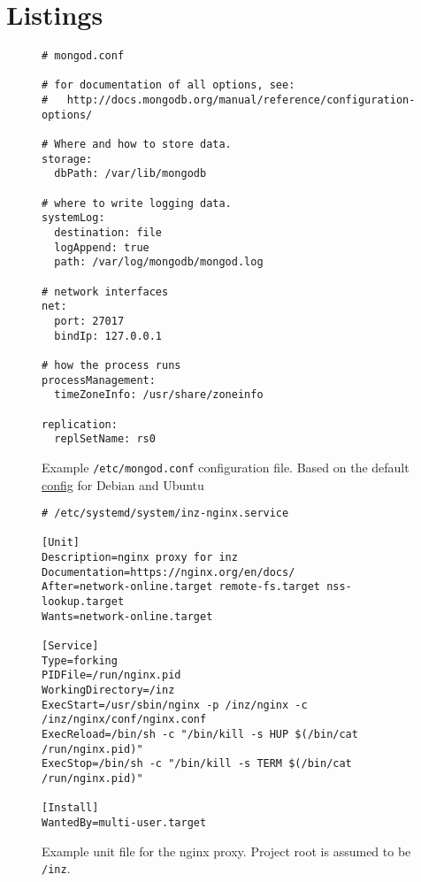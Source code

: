 \chapter{Listings}

\begin{figure}
	\centering
	\begin{verbatim}
# mongod.conf

# for documentation of all options, see:
#   http://docs.mongodb.org/manual/reference/configuration-options/

# Where and how to store data.
storage:
  dbPath: /var/lib/mongodb

# where to write logging data.
systemLog:
  destination: file
  logAppend: true
  path: /var/log/mongodb/mongod.log

# network interfaces
net:
  port: 27017
  bindIp: 127.0.0.1

# how the process runs
processManagement:
  timeZoneInfo: /usr/share/zoneinfo

replication:
  replSetName: rs0
	\end{verbatim}
	\caption{Example \texttt{/etc/mongod.conf} configuration file. Based on the default \href{https://github.com/mongodb/mongo/blob/e4fff3e1fe7b31b25cedde7b05205325b47b4a7d/debian/mongod.conf}{config} for Debian and Ubuntu}
	\label{fig:example-mongod}
\end{figure}

\begin{figure}
	\centering
	\begin{verbatim}
# /etc/systemd/system/inz-nginx.service

[Unit]
Description=nginx proxy for inz
Documentation=https://nginx.org/en/docs/
After=network-online.target remote-fs.target nss-lookup.target
Wants=network-online.target

[Service]
Type=forking
PIDFile=/run/nginx.pid
WorkingDirectory=/inz
ExecStart=/usr/sbin/nginx -p /inz/nginx -c /inz/nginx/conf/nginx.conf
ExecReload=/bin/sh -c "/bin/kill -s HUP $(/bin/cat /run/nginx.pid)"
ExecStop=/bin/sh -c "/bin/kill -s TERM $(/bin/cat /run/nginx.pid)"

[Install]
WantedBy=multi-user.target
	\end{verbatim}
	\caption{Example unit file for the nginx proxy. Project root is assumed to be \texttt{/inz}.}
	\label{fig:example-nginx-service}
\end{figure}

